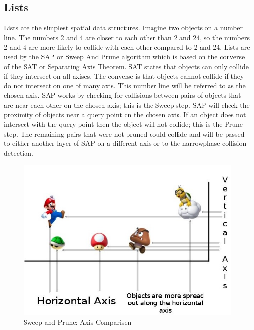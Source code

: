 \documentclass[conference]{IEEEtran}
\begin{document}
	\subsection{Lists}
	Lists are the simplest spatial data structures. Imagine two objects on a number line. The numbers 2 and 4 are closer to each other than 2 and 24, so the numbers 2 and 4 are more likely to collide with each other compared to 2 and 24. Lists are used by the SAP or Sweep And Prune algorithm which is based on the converse of the SAT or Separating Axis Theorem. SAT states that objects can only collide if they intersect on all axises. The converse is that objects cannot collide if they do not intersect on one of many axis. This number line will be referred to as the chosen axis. SAP works by checking for collisions between pairs of objects that are near each other on the chosen axis; this is the Sweep step. SAP will check the proximity of objects near a query point on the chosen axis. If an object does not intersect with the query point then the object will not collide; this is the Prune step. The remaining pairs that were not pruned could collide and will be passed to either another layer of SAP on a different axis or to the narrowphase collision detection.\\

\begin{figure}[!h]
\centering
\includegraphics[scale=0.4]{sweep}
\caption{Sweep and Prune: Axis Comparison}
\label{fig_sim}
\end{figure}
\end{document}

